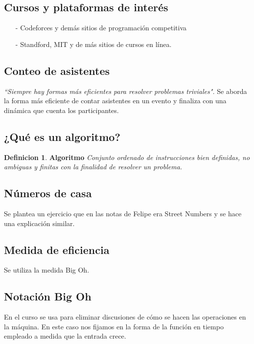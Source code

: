 \documentclass{article}
\theoremstyle{definition}
\newtheorem{definition}{Definicion}
\begin{document}
\begin{flushleft}
\begin{itemize}
\end{itemize}

\subsection{Cursos y plataformas de interés}

\begin{itemize}

  \item[-] Codeforces y demás sitios de programación competitiva
  \item[-] Standford, MIT y de más sitios de cursos en línea.

\end{itemize}

\subsection{Conteo de asistentes}
\textit{``Siempre hay formas más eficientes para resolver problemas 
triviales".}
Se aborda la forma más eficiente de contar asistentes en un evento y finaliza
con una dinámica que cuenta los participantes.

\subsection{¿Qué es un algoritmo?}

\begin{definition}
\textbf{Algoritmo}
\textit{Conjunto ordenado de instrucciones bien definidas, no ambiguas y 
finitas con la finalidad de resolver un problema.}
\end{definition}

\subsection{Números de casa}
Se plantea un ejercicio que en las notas de Felipe era Street Numbers y se 
hace una explicación similar. 

\subsection{Medida de eficiencia}
Se utiliza la medida Big Oh. 

\subsection{Notación Big Oh}
En el curso se usa para eliminar discusiones de cómo se hacen las operaciones
en la máquina. En este caso nos fijamos en la forma de la función en tiempo 
empleado a medida que la entrada crece.


\end{flushleft}
\end{document}
